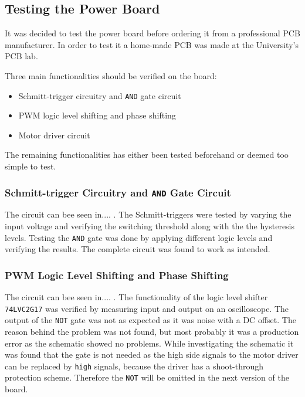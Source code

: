 \subsection{Testing the Power Board}
It was decided to test the power board before ordering it from a professional PCB manufacturer.
In order to test it a home-made PCB was made at the University's PCB lab.

Three main functionalities should be verified on the board:

\begin{itemize}
	\item Schmitt-trigger circuitry and \texttt{AND} gate circuit
	\item PWM logic level shifting and phase shifting
	\item Motor driver circuit
\end{itemize}

The remaining functionalities has either been tested beforehand or deemed too simple to test. 

\subsubsection{Schmitt-trigger Circuitry and \texttt{AND} Gate Circuit}
The circuit can bee seen in.... .
The Schmitt-triggers were tested by varying the input voltage and verifying the switching threshold along with the the hysteresis levels. 
Testing the \texttt{AND} gate was done by applying different logic levels and verifying the results.
The complete circuit was found to work as intended.

\subsubsection{PWM Logic Level Shifting and Phase Shifting}
The circuit can bee seen in.... .
The functionality of the logic level shifter \texttt{74LVC2G17} was verified by measuring input and output on an oscilloscope. 
The output of the \texttt{NOT} gate was not as expected as it was noise with a DC offset. 
The reason behind the problem was not found, but most probably it was a production error as the schematic showed no problems.
While investigating the schematic it was found that the gate is not needed as the high side signals to the motor driver can be replaced by \texttt{high} signals, because the driver has a shoot-through protection scheme.
Therefore the \texttt{NOT} will be omitted in the next version of the board.

